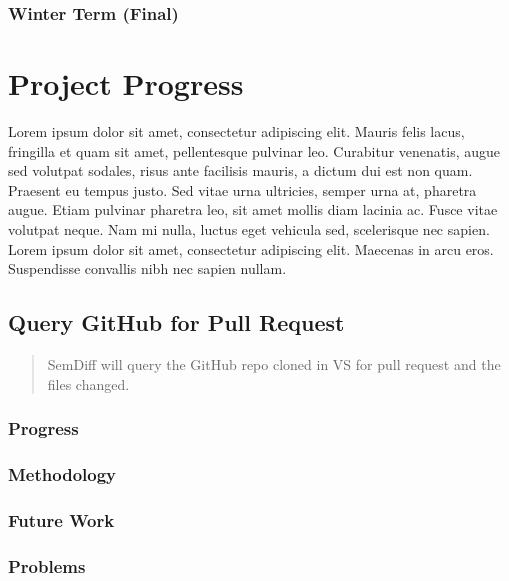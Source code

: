 \documentclass[draftclsnofoot,onecolumn]{IEEEtran}
\begin{document}
\subsubsection{Winter Term (Final)}










\section{Project Progress}
Lorem ipsum dolor sit amet, consectetur adipiscing elit. Mauris felis lacus, fringilla et quam sit amet, pellentesque pulvinar leo. Curabitur venenatis, augue sed volutpat sodales, risus ante facilisis mauris, a dictum dui est non quam. Praesent eu tempus justo. Sed vitae urna ultricies, semper urna at, pharetra augue. Etiam pulvinar pharetra leo, sit amet mollis diam lacinia ac. Fusce vitae volutpat neque. Nam mi nulla, luctus eget vehicula sed, scelerisque nec sapien. Lorem ipsum dolor sit amet, consectetur adipiscing elit. Maecenas in arcu eros. Suspendisse convallis nibh nec sapien nullam.






\subsection{Query GitHub for Pull Request}

\begin{quote}

SemDiff will query the GitHub repo cloned in VS for pull request and the files changed.

\end{quote}

\subsubsection{Progress}

\subsubsection{Methodology}

\subsubsection{Future Work}

\subsubsection{Problems}
\end{document}

